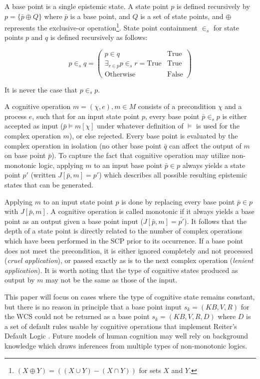 \documentclass[
11pt, %
english, %
singlespacing, %
headsepline, %
]{MastersDoctoralThesis} %
\begin{document}
A base point is a single epistemic state. A state point $p$ is defined recursively by $p=\{\bar{p} \oplus Q \}$ where $\bar{p}$ is a base point, and $Q$ is a set of state points, and $\oplus$ represents the exclusive-or operation\footnote{$(X \oplus Y) = ((X \cup Y) - (X \cap Y))$ for sets $X$ and $Y$.}. State point containment $\in_s$ for state points $p$ and $q$ is defined recursively as follows:

\[
p \in_s q = \begin{pmatrix} p \in q  & \textrm{True} \\   \exists_{r\in p}p \in_s r = \textrm{True} & \textrm{True}   \\ \textrm{Otherwise} & \textrm{False} \end{pmatrix}
\]

It is never the case that $p \in_s p$.

A cognitive operation $m = (\chi, e), m \in M$ consists of a precondition $\chi$ and a process $e$, such that for an input state point $p$, every base point $\bar{p} \in_s p$ is either accepted as input ($\bar{p} \models m[\chi]$ under whatever definition of $\models$ is used for the complex operation $m$), or else rejected. Every base point is evaluated by the complex operation in isolation (no other base point $\bar{q}$ can affect the output of $m$ on base point $\bar{p}$). To capture the fact that cognitive operation may utilize non-monotonic logic, applying $m$ to an input base point $\bar{p}\in p$ always yields a state point $p'$ (written $J[\bar{p},m]=p'$) which describes all possible resulting epistemic states that can be generated. 

Applying $m$ to an input state point $p$ is done by replacing every base point $\bar{p} \in p$ with $J[\bar{p},m]$. A cognitive operation is called monotonic if it always yields a base point as an output given a base point input ($J[\bar{p},m]=\bar{p'}$). It follows that the depth of a state point is directly related to the number of complex operations which have been performed in the SCP prior to its occurrence. If a base point does not meet the precondition, it is either ignored completely and not processed (\textit{cruel application}), or passed exactly as is to the next complex operation (\textit{lenient application}). It is worth noting that the type of cognitive states produced as output by $m$ may not be the same as those of the input.

This paper will focus on cases where the type of cognitive state remains constant, but there is no reason in principle that a base point input $s_k = (KB,V,R)$ for the WCS could not be returned as a base point $s_k = (KB,V,R,D)$ where $D$ is a set of default rules usable by cognitive operations that implement Reiter's Default Logic \citep{reiter1980logic}. Future models of human cognition may well rely on background knowledge which draws inferences from multiple types of non-monotonic logics.
\end{document}
